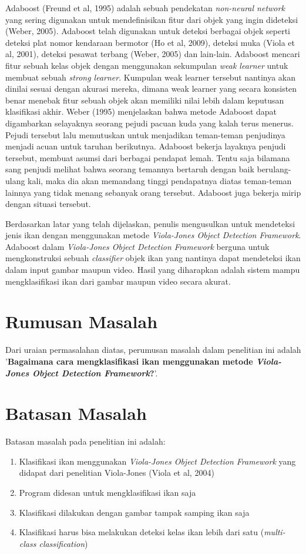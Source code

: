 Adaboost (Freund et al, 1995) adalah sebuah pendekatan \textit{non-neural network} 
yang sering digunakan untuk mendefinisikan fitur dari objek yang ingin 
dideteksi (Weber, 2005). Adaboost telah digunakan untuk deteksi berbagai objek 
seperti deteksi plat nomor kendaraan bermotor (Ho et al, 2009), deteksi muka 
(Viola et al, 2001), deteksi pesawat terbang (Weber, 2005) dan lain-lain. 
Adaboost mencari fitur sebuah kelas objek dengan menggunakan sekumpulan 
\emph{weak learner} untuk membuat sebuah \emph{strong learner}. 
Kumpulan weak learner tersebut nantinya akan dinilai sesuai dengan akurasi 
mereka, dimana weak learner yang secara konsisten benar menebak fitur sebuah 
objek akan memiliki nilai lebih dalam keputusan klasifikasi akhir. Weber (1995) 
menjelaskan bahwa metode Adaboost dapat digambarkan selayaknya seorang pejudi 
pacuan kuda yang kalah terus menerus. Pejudi tersebut lalu memutuskan untuk 
menjadikan teman-teman penjudinya menjadi acuan untuk taruhan berikutnya. 
Adaboost bekerja layaknya penjudi tersebut, membuat asumsi dari berbagai 
pendapat lemah. Tentu saja bilamana sang penjudi melihat bahwa seorang 
temannya bertaruh dengan baik berulang-ulang kali, maka dia akan 
memandang tinggi pendapatnya diatas teman-teman lainnya yang tidak menang 
sebanyak orang tersebut. Adaboost juga bekerja mirip dengan situasi tersebut.

Berdasarkan latar yang telah dijelaskan, penulis mengusulkan untuk mendeteksi 
jenis ikan dengan menggunakan metode \emph{Viola-Jones Object Detection Framework}. 
Adaboost dalam \emph{Viola-Jones Object Detection Framework} berguna untuk 
mengkonstruksi sebuah \emph{classifier} objek ikan yang nantinya dapat mendeteksi 
ikan dalam input gambar maupun video. Hasil yang diharapkan adalah sistem 
mampu mengklasifikasi ikan dari gambar maupun video secara akurat.

\section{Rumusan Masalah}
Dari uraian permasalahan diatas, perumusan masalah dalam penelitian ini adalah 
'\textbf{Bagaimana cara mengklasifikasi ikan menggunakan metode 
\textit{Viola-Jones Object Detection Framework}?}'.

\section{Batasan Masalah}
Batasan masalah pada penelitian ini adalah:
\begin{enumerate}
	\item Klasifikasi ikan menggunakan \textit{Viola-Jones Object Detection Framework} yang didapat dari penelitian Viola-Jones (Viola et al, 2004)
	\item Program didesan untuk mengklasifikasi ikan saja
	\item Klasifikasi dilakukan dengan gambar tampak samping ikan saja
	\item Klasifikasi harus bisa melakukan deteksi kelas ikan lebih dari satu (\textit{multi-class classification})
\end{enumerate}

